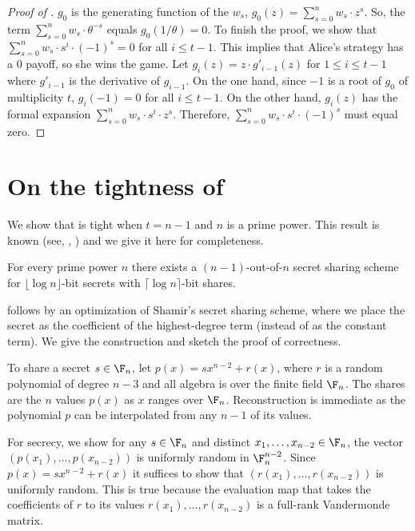 \documentclass{toc}
\begin{document}
\begin{proof}[Proof of ]
$g_0$ is the generating function of 
the  %
$w_s$, $g_0(z) =
\sum^n_{s=0} w_s \cdot z^s$. So, the term $\sum_{s=0}^n w_s \cdot \theta^{-s}$
equals $g_0(1/\theta) = 0$.  To finish the proof, we show that $\sum_{s=0}^n w_s
	\cdot s^i \cdot (-1)^s = 0$ for all $i \leq t - 1$. This implies that Alice's
	strategy has a 0 payoff, so she wins the game.  Let $g_i(z) =
	z\cdot g'_{i-1}(z)$ for $1 \leq i \leq t - 1$ where $g'_{i-1}$ is the derivative
	of $g_{i-1}$.  On the one hand, since $-1$ is a root of $g_0$ of multiplicity
	$t$, $g_i(-1) = 0$ for all $i \leq t - 1$.  On the other hand, $g_i(z)$ has the
	formal expansion $\sum_{s=0}^n w_s \cdot s^i \cdot z^s$.  Therefore,
	$\sum_{s=0}^n w_s \cdot s^i \cdot (-1)^s$ must equal zero.
\end{proof}

\section{On the tightness of }
\label{sec:shamir}

We show that  is tight when $t = n - 1$ and $n$ is
a prime power. This result is known (see, \eg, \cite[Theorem 11.13]{CDN2015})
and we give it here for completeness.

\begin{claim}
	\label{claim:shamiropt}
For every prime power $n$ 
there exists a $(n-1)$-out-of-$n$ secret sharing scheme for 
$\lfloor \log n\rfloor $-bit secrets with $\lceil \log n\rceil $-bit shares.
\end{claim}

 follows by an optimization 
of Shamir's secret sharing scheme, where we place the secret as
the coefficient of the highest-degree term (instead of as the constant term).  We give the construction and sketch the 
proof of correctness.

To share a secret $s \in \F_n$, let $p(x) = sx^{n-2} + r(x)$, where $r$ 
is a random polynomial of degree $n - 3$ and all algebra is over the 
finite field $\F_n$.  The shares are the $n$ values $p(x)$ as $x$ 
ranges over $\F_n$. Reconstruction is immediate as the polynomial 
$p$ can be interpolated from any $n - 1$ of its values.

%
For secrecy, we show for any $s \in \F_n$ and distinct $x_1,\dots,x_{n-2} \in \F_n$, the vector $(p(x_1), \dots, p(x_{n-2}))$ is uniformly random in $\F_n^{n-2}$.  Since $p(x) = sx^{n-2} + r(x)$ it suffices to show that $(r(x_1),\dots, r(x_{n-2}))$ is uniformly random.  This is true because the evaluation map that takes the coefficients of $r$ to  
its values $r(x_1),\dots, r(x_{n-2})$ is a full-rank Vandermonde matrix.
\end{document}
